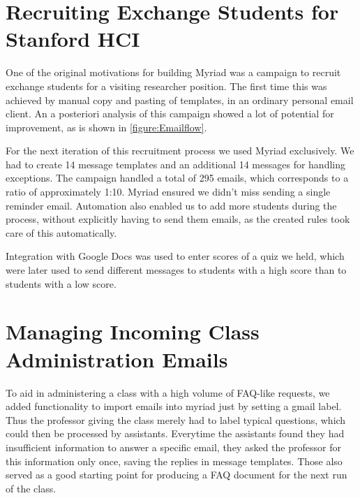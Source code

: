 \section{Recruiting Exchange Students for Stanford HCI}

One of the original motivations for building Myriad was a campaign to recruit exchange students for a visiting researcher position. The first time this was achieved by manual copy and pasting of templates, in an ordinary personal email client. An a posteriori analysis of this campaign showed a lot of potential for improvement, as is shown in \autoref{figure:Emailflow}.


For the next iteration of this recruitment process we used Myriad exclusively. We had to create 14 message templates and an additional 14 messages for handling exceptions. The campaign handled a total of 295 emails, which corresponds to a ratio of approximately 1:10. Myriad ensured we didn’t miss sending a single reminder email. Automation also enabled us to add more students during the process, without explicitly having to send them emails, as the created rules took care of this automatically.

Integration with Google Docs was used to enter scores of a quiz we held, which were later used to send different messages to students with a high score than to students with a low score.

\section{Managing Incoming Class Administration Emails}

To aid in administering a class with a high volume of FAQ-like requests, we added functionality to import emails into myriad just by setting a gmail label. Thus the professor giving the class merely had to label typical questions, which could then be processed by assistants. Everytime the assistants found they had insufficient information to answer a specific email, they asked the professor for this information only once, saving the replies in message templates. Those also served as a good starting point for producing a FAQ document for the next run of the class.

